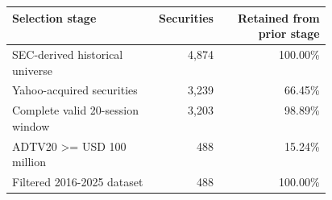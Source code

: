 \begin{tabular}{@{}p{0.46\linewidth}rr@{}}
\toprule
Selection stage & Securities & Retained from prior stage \\
\midrule
SEC-derived historical universe & 4,874 & 100.00\% \\
Yahoo-acquired securities & 3,239 & 66.45\% \\
Complete valid 20-session window & 3,203 & 98.89\% \\
ADTV20 >= USD 100 million & 488 & 15.24\% \\
Filtered 2016-2025 dataset & 488 & 100.00\% \\
\bottomrule
\end{tabular}
